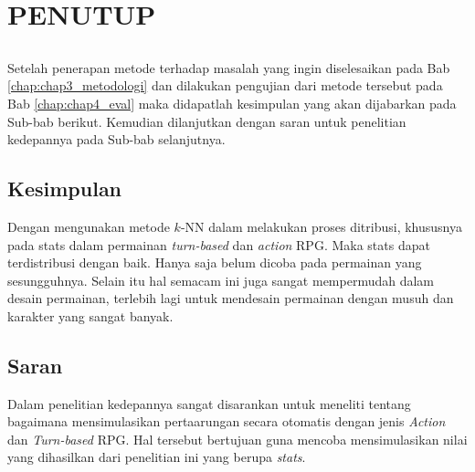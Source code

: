 \chapter{PENUTUP}
\label{sec:chap5_tutup}
\vspace{1ex}

\section*{}
Setelah penerapan metode terhadap masalah yang ingin diselesaikan pada Bab \ref{chap:chap3_metodologi} dan dilakukan pengujian dari metode tersebut pada Bab \ref*{chap:chap4_eval} maka didapatlah kesimpulan yang akan dijabarkan pada Sub-bab berikut. Kemudian dilanjutkan dengan saran untuk penelitian kedepannya pada Sub-bab selanjutnya.
\vspace{1ex}

\section{Kesimpulan}
\label{sec:sec4_kesimpulan}
\vspace{1ex}

Dengan mengunakan metode $k$-NN dalam melakukan proses ditribusi, khususnya pada stats dalam permainan \textit{turn-based} dan \textit{action} RPG. Maka stats dapat terdistribusi dengan baik. Hanya saja belum dicoba pada permainan yang sesungguhnya. Selain itu hal semacam ini juga sangat mempermudah dalam desain permainan, terlebih lagi untuk mendesain permainan dengan musuh dan karakter yang sangat banyak.
\vspace{1ex}

\section{Saran}
\label{sec:sec4_saran}
\vspace{1ex}

Dalam penelitian kedepannya sangat disarankan untuk meneliti tentang bagaimana mensimulasikan pertaarungan secara otomatis dengan jenis \textit{Action} dan \textit{Turn-based} RPG. Hal tersebut bertujuan guna mencoba mensimulasikan nilai yang dihasilkan dari penelitian ini yang berupa \textit{stats}.